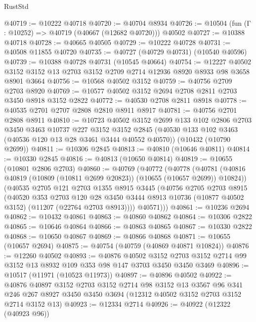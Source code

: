 \begin{lexlean}{RustStd}
\begin{coremodule}
@40719 := @10222 @40718
@40720 := @40704 @8934
@40726 := @10504 (fun (Γ : @10252) => @40719 (@40667 (@12682 @40720))) @40502
@40727 := @10388 @40718
@40728 := @40665 @40505
@40729 := @10222 @40728
@40731 := @40508 @11855 @40720
@40735 := @40727 (@40729 @40731) (@10540 @40596)
@40739 := @10388 @40728 @40731 (@10545 @40664)
@40754 := @12227
    @40502
    @3152
    @3152
    @13
    @2703
    @3152
    @2709
    @2714
    @12936
    @8920
    @8933
    @98
    @3658
    @8901
    @3664
@40756 := @10568 @40502 @3152
@40759 := @40756 @2709 @2703 @8920
@40769 := @10577 @40502 @3152 @2694 @2708 @2811 @2703 @3450 @8918 @3152 @2822
@40772 := @40530 @2708 @2811 @8918
@40778 := @40535 @2701 @2707 @2808 @2810 @8911 @8917
@40781 := @40756 @2701 @2808 @8911
@40810 := @10723
    @40502
    @3152
    @2699
    @133
    @102
    @2806
    @2703
    @3450
    @3463
    @10737
    @227
    @3152
    @3152
    @2845
    (@40530 @133 @102 @3463 (@40536 @120 @13 @28 @3461 @3444 @40552 @40570))
    (@10432 (@10790 @2699))
@40811 := @10306 @2845
@40813 := @40810 (@10646 @40811)
@40814 := @10330 @2845
@40816 := @40813 (@10650 @40814)
@40819 := @10655 (@10801 @2806 @2703)
@40860 := @40769
    (@40772
      (@40778
        (@40781 (@40816 @40819 (@10809 (@10811 @2699 @20823)) (@10655 (@10657 @2699)) @10824))
        (@40535
          @2705
          @121
          @2703
          @1355
          @8915
          @3445
          (@40756
            @2705
            @2703
            @8915
            (@40520
              @353
              @2703
              @120
              @28
              @3450
              @3444
              @8913
              @10736
              (@10877 @40502 @3152)
              (@11207 (@22764 @2703 @8913))))
          @40571)))
@40861 := @10236 @2694
@40862 := @10432 @40861
@40863 := @40860 @40862
@40864 := @10306 @2822
@40865 := @10646 @40864
@40866 := @40863 @40865
@40867 := @10330 @2822
@40868 := @10650 @40867
@40869 := @40866 @40868
@40871 := @10655 (@10657 @2694)
@40875 := @40754 (@40759 (@40869 @40871 @10824))
@40876 := @12260 @40502
@40893 := @40876
    @40502
    @3152
    @2703
    @3152
    @2714
    @99
    @3152
    @13
    @8932
    @109
    @353
    @98
    @147
    @3703
    @3450
    @3450
    @3469
@40896 := @10517 (@11971 (@10523 @11973))
@40897 := @40896 @40502
@40922 := @40876
    @40897
    @3152
    @2703
    @3152
    @2714
    @98
    @3152
    @13
    @3567
    @96
    @341
    @246
    @267
    @8927
    @3450
    @3450
    @3694
    (@12312 @40502 @3152 @2703 @3152 @2714 @3152 @13)
@40923 := @12334 @2714
@40926 := @40922 (@12322 (@40923 @96))

\end{coremodule}
\end{lexlean}

